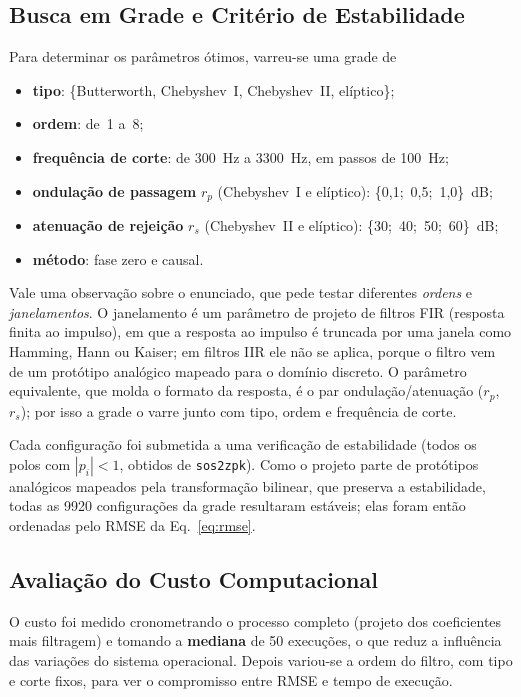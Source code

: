 \subsection{Busca em Grade e Critério de Estabilidade}
Para determinar os parâmetros ótimos, varreu-se uma grade de
\begin{itemize}
  \item \textbf{tipo}: \{Butterworth, Chebyshev~I, Chebyshev~II, elíptico\};
  \item \textbf{ordem}: de~1 a~8;
  \item \textbf{frequência de corte}: de \SI{300}{\hertz} a \SI{3300}{\hertz},
        em passos de \SI{100}{\hertz};
  \item \textbf{ondulação de passagem} $r_p$ (Chebyshev~I e elíptico):
        \{0{,}1;\ 0{,}5;\ 1{,}0\}~dB;
  \item \textbf{atenuação de rejeição} $r_s$ (Chebyshev~II e elíptico):
        \{30;\ 40;\ 50;\ 60\}~dB;
  \item \textbf{método}: fase zero e causal.
\end{itemize}
Vale uma observação sobre o enunciado, que pede testar diferentes
\emph{ordens} e \emph{janelamentos}. O janelamento é um parâmetro de projeto de
filtros FIR (resposta finita ao impulso), em que a resposta ao impulso
é truncada por uma janela como Hamming, Hann ou Kaiser; em filtros IIR ele não se
aplica, porque o filtro vem de um protótipo analógico mapeado para o
domínio discreto. O
parâmetro equivalente, que molda o formato da resposta, é o par
ondulação/atenuação ($r_p$, $r_s$); por isso a grade o varre
junto com tipo, ordem e frequência de corte.

Cada configuração foi submetida a uma verificação de estabilidade (todos os
polos com $|p_i|<1$, obtidos de \texttt{sos2zpk}). Como o projeto parte de
protótipos analógicos mapeados pela transformação bilinear, que preserva a
estabilidade, todas as \num{9920} configurações da grade resultaram estáveis;
elas foram então ordenadas pelo RMSE da Eq.~\eqref{eq:rmse}.

\subsection{Avaliação do Custo Computacional}
O custo foi medido cronometrando o processo completo (projeto dos
coeficientes mais filtragem) e tomando a \textbf{mediana} de \num{50}
execuções, o que reduz a influência das variações do sistema operacional. Depois
variou-se a ordem do filtro, com tipo e corte fixos, para ver o
compromisso entre RMSE e tempo de execução.
